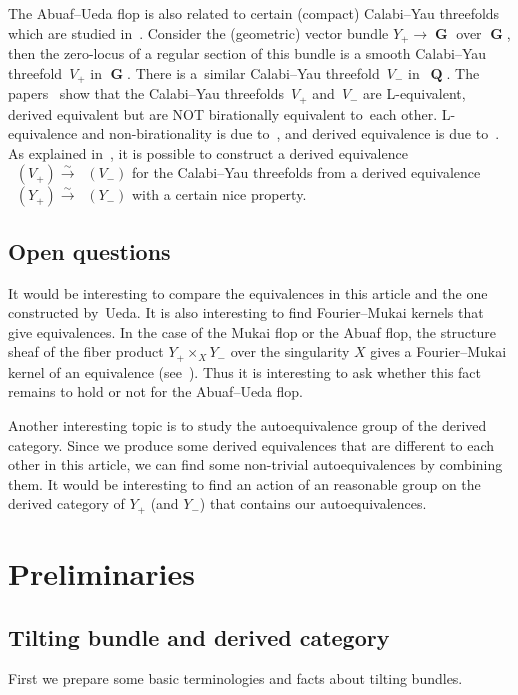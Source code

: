 \documentclass[pdftex]{sigma}
\DeclareMathOperator{\D}{D^b}
\DeclareMathOperator{\G}{\mathbf{G}}
\DeclareMathOperator{\Q}{\mathbf{Q}}
\numberwithin{equation}{section}
\begin{document}
The Abuaf--Ueda flop is also related to certain (compact) Calabi--Yau threefolds which are studied in~\cite{IMOU16a, IMOU16b, Kuz18}.
Consider the (geometric) vector bundle $Y_+ \to \G$ over $\G$,
then the zero-locus of a regular section of this bundle is a smooth Calabi--Yau threefold~$V_+$ in $\G$.
There is a~similar Calabi--Yau threefold~$V_-$ in~$\Q$.
The papers~\cite{IMOU16b, Kuz18} show that the Calabi--Yau threefolds~$V_+$ and~$V_-$ are L-equivalent, derived equivalent
but are NOT birationally equivalent to~each other.
L-equivalence and non-birationality is due to~\cite{IMOU16b}, and derived equivalence is due to~\cite{Kuz18}.
As explained in~\cite{Ued16}, it is possible to construct a derived equivalence $\D(V_+) \xrightarrow{\sim} \D(V_-)$
for the Calabi--Yau threefolds from a derived equivalence $\D(Y_+) \xrightarrow{\sim} \D(Y_-)$ with a certain nice property.

\subsection{Open questions}
It would be interesting to compare the equivalences in this article and the one constructed by~Ueda.
It is also interesting to find Fourier--Mukai kernels that give equivalences.
In the case of the Mukai flop or the Abuaf flop, the structure sheaf of the fiber product $Y_+ \times_X Y_-$ over the singularity $X$
gives a Fourier--Mukai kernel of an equivalence (see~\cite{H17b, Ka02, Na03}).
Thus it is interesting to ask whether this fact remains to hold or not for the Abuaf--Ueda flop.

Another interesting topic is to study the autoequivalence group of the derived category.
Since we produce some derived equivalences that are different to each other in this article, we can find some non-trivial autoequivalences
by combining them.
It would be interesting to find an action of an reasonable group on the derived category of $Y_+$ (and $Y_-$)
that contains our autoequivalences.

\section{Preliminaries}

\subsection{Tilting bundle and derived category}

First we prepare some basic terminologies and facts about tilting bundles.
\end{document}
